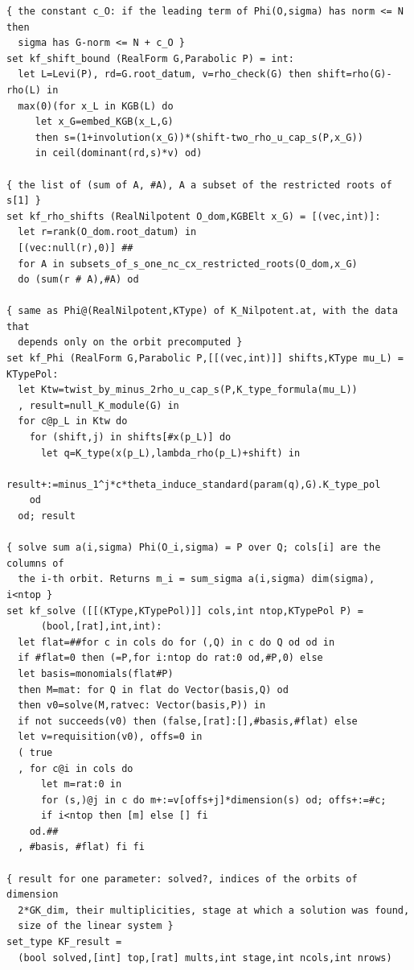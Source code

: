 \documentclass[11pt,leqno]{article}
\theoremstyle{definition}
\numberwithin{equation}{section}
\begin{document}
{\begin{verbatim}
{ the constant c_O: if the leading term of Phi(O,sigma) has norm <= N then
  sigma has G-norm <= N + c_O }
set kf_shift_bound (RealForm G,Parabolic P) = int:
  let L=Levi(P), rd=G.root_datum, v=rho_check(G) then shift=rho(G)-rho(L) in
  max(0)(for x_L in KGB(L) do
     let x_G=embed_KGB(x_L,G)
     then s=(1+involution(x_G))*(shift-two_rho_u_cap_s(P,x_G))
     in ceil(dominant(rd,s)*v) od)

{ the list of (sum of A, #A), A a subset of the restricted roots of s[1] }
set kf_rho_shifts (RealNilpotent O_dom,KGBElt x_G) = [(vec,int)]:
  let r=rank(O_dom.root_datum) in
  [(vec:null(r),0)] ##
  for A in subsets_of_s_one_nc_cx_restricted_roots(O_dom,x_G)
  do (sum(r # A),#A) od

{ same as Phi@(RealNilpotent,KType) of K_Nilpotent.at, with the data that
  depends only on the orbit precomputed }
set kf_Phi (RealForm G,Parabolic P,[[(vec,int)]] shifts,KType mu_L) = KTypePol:
  let Ktw=twist_by_minus_2rho_u_cap_s(P,K_type_formula(mu_L))
  , result=null_K_module(G) in
  for c@p_L in Ktw do
    for (shift,j) in shifts[#x(p_L)] do
      let q=K_type(x(p_L),lambda_rho(p_L)+shift) in
      result+:=minus_1^j*c*theta_induce_standard(param(q),G).K_type_pol
    od
  od; result

{ solve sum a(i,sigma) Phi(O_i,sigma) = P over Q; cols[i] are the columns of
  the i-th orbit. Returns m_i = sum_sigma a(i,sigma) dim(sigma), i<ntop }
set kf_solve ([[(KType,KTypePol)]] cols,int ntop,KTypePol P) =
      (bool,[rat],int,int):
  let flat=##for c in cols do for (,Q) in c do Q od od in
  if #flat=0 then (=P,for i:ntop do rat:0 od,#P,0) else
  let basis=monomials(flat#P)
  then M=mat: for Q in flat do Vector(basis,Q) od
  then v0=solve(M,ratvec: Vector(basis,P)) in
  if not succeeds(v0) then (false,[rat]:[],#basis,#flat) else
  let v=requisition(v0), offs=0 in
  ( true
  , for c@i in cols do
      let m=rat:0 in
      for (s,)@j in c do m+:=v[offs+j]*dimension(s) od; offs+:=#c;
      if i<ntop then [m] else [] fi
    od.##
  , #basis, #flat) fi fi

{ result for one parameter: solved?, indices of the orbits of dimension
  2*GK_dim, their multiplicities, stage at which a solution was found,
  size of the linear system }
set_type KF_result =
  (bool solved,[int] top,[rat] mults,int stage,int ncols,int nrows)


\end{verbatim}}
\end{document}
